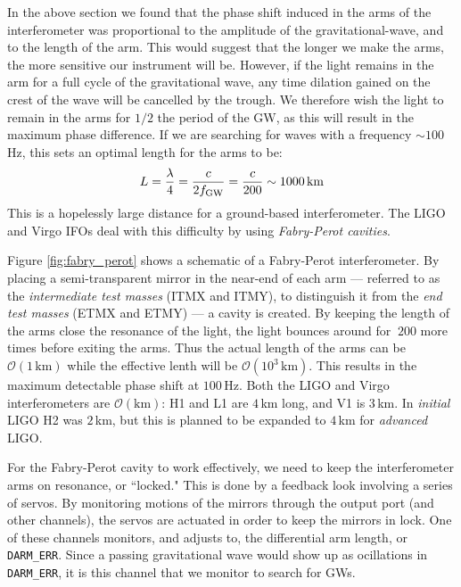 In the above section we found that the phase shift induced in the arms of the interferometer was proportional to the amplitude of the gravitational-wave, and to the length of the arm. This would suggest that the longer we make the arms, the more sensitive our instrument will be. However, if the light remains in the arm for a full cycle of the gravitational wave, any time dilation gained on the crest of the wave will be cancelled by the trough. We therefore wish the light to remain in the arms for $1/2$ the period of the \ac{GW}, as this will result in the maximum phase difference. If we are searching for waves with a frequency $\sim 100\,$Hz, this sets an optimal length for the arms to be:
\begin{equation}
L = \frac{\lambda}{4} = \frac{c}{2f_{\mathrm{GW}}} = \frac{c}{200} \sim 1000\,\mathrm{km}
\end{equation}
This is a hopelessly large distance for a ground-based interferometer. The LIGO and Virgo \acp{IFO} deal with this difficulty by using \emph{Fabry-Perot cavities}.

Figure \ref{fig:fabry_perot} shows a schematic of a Fabry-Perot interferometer. By placing a semi-transparent mirror in the near-end of each arm --- referred to as the \emph{intermediate test masses} (ITMX and ITMY), to distinguish it from the \emph{end test masses} (ETMX and ETMY) --- a cavity is created. By keeping the length of the arms close the resonance of the light, the light bounces around for $~200$ more times \cite{ref:Brown} before exiting the arms. Thus the actual length of the arms can be $\mathcal{O}(1\,\mathrm{km})$ while the effective lenth will be $\mathcal{O}(10^3\,\mathrm{km})$. This results in the maximum detectable phase shift at $100\,$Hz. Both the \ac{LIGO} and Virgo interferometers are $\mathcal{O}(\mathrm{km})$: H1 and L1 are $4\,$km long, and V1 is $3\,$km. In \emph{initial} \ac{LIGO} H2 was $2\,$km, but this is planned to be expanded to $4\,$km for \emph{advanced} \ac{LIGO}.

For the Fabry-Perot cavity to work effectively, we need to keep the interferometer arms on resonance, or ``locked." This is done by a feedback look involving a series of servos. By monitoring motions of the mirrors through the output port (and other channels), the servos are actuated in order to keep the mirrors in lock. One of these channels monitors, and adjusts to, the differential arm length, or \verb|DARM_ERR|. Since a passing gravitational wave would show up as ocillations in \verb|DARM_ERR|, it is this channel that we monitor to search for \acp{GW}.

